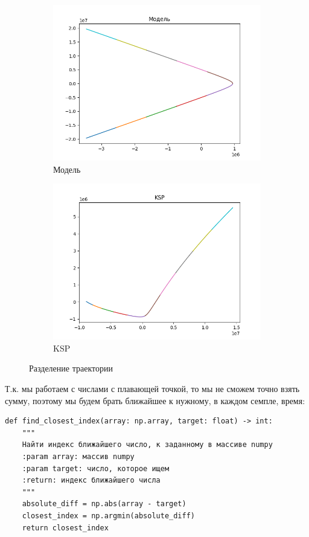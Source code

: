 \documentclass{article}
\begin{document}
    \begin{figure}[H]
        \begin{subfigure}{0.5\textwidth}
            \includegraphics[width=1\linewidth]{images/model_split.png}
            \caption{Модель}
        \end{subfigure}
        \begin{subfigure}{0.5\textwidth}
            \includegraphics[width=1\linewidth]{images/ksp_split.png}
            \caption{KSP}
        \end{subfigure}
    \caption{Разделение траектории}
    \end{figure}
    Т.к. мы работаем с числами с плавающей точкой, то мы не сможем точно взять сумму, поэтому мы будем брать ближайшее к нужному, в каждом семпле, время:
    \begin{verbatim}
def find_closest_index(array: np.array, target: float) -> int:
    """
    Найти индекс ближайшего число, к заданному в массиве numpy
    :param array: массив numpy
    :param target: число, которое ищем
    :return: индекс ближайшего числа
    """
    absolute_diff = np.abs(array - target)
    closest_index = np.argmin(absolute_diff)
    return closest_index
    \end{verbatim}
    
\end{document}
